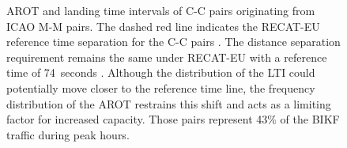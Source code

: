 \begin{figure}[h]
    \centering
    
    
    \caption[AROT and LTI of C-C pairs originating from ICAO M-M pairs]{AROT and landing time intervals of C-C pairs originating from ICAO M-M pairs. The dashed red line indicates the RECAT-EU reference time separation for the C-C pairs \protect{}. The distance separation requirement remains the same under RECAT-EU with a reference time of 74~seconds \protect{}. Although the distribution of the LTI could potentially move closer to the reference time line, the frequency distribution of the AROT restrains this shift and acts as a limiting factor for increased capacity. Those pairs represent 43\% of the BIKF traffic during peak hours.}
    \label{fig:CC_from_MM_pairs_time_sep}
\end{figure}

